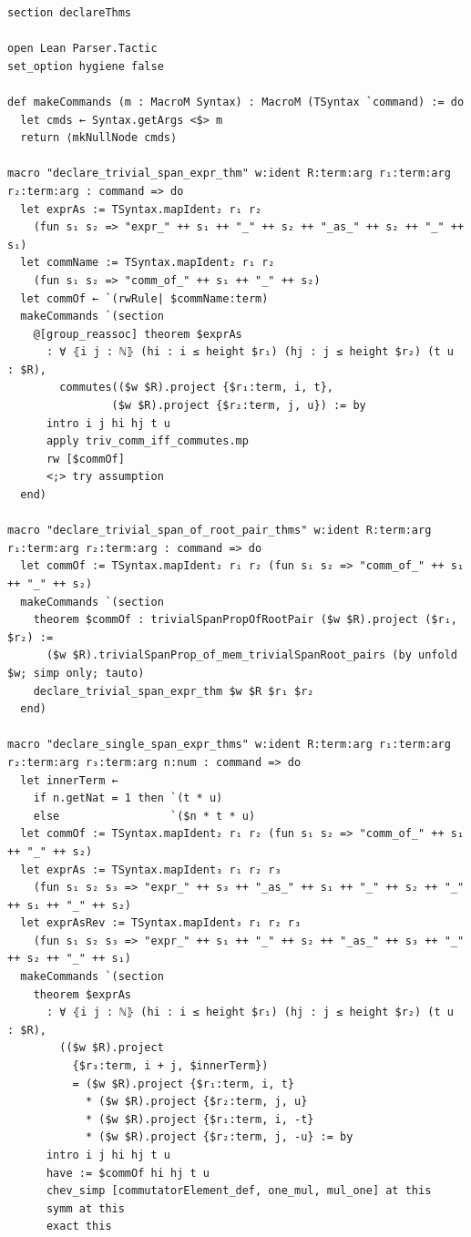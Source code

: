 \begin{Verbatim}
section declareThms

open Lean Parser.Tactic
set_option hygiene false

def makeCommands (m : MacroM Syntax) : MacroM (TSyntax `command) := do
  let cmds ← Syntax.getArgs <$> m
  return ⟨mkNullNode cmds⟩

macro "declare_trivial_span_expr_thm" w:ident R:term:arg r₁:term:arg r₂:term:arg : command => do
  let exprAs := TSyntax.mapIdent₂ r₁ r₂
    (fun s₁ s₂ => "expr_" ++ s₁ ++ "_" ++ s₂ ++ "_as_" ++ s₂ ++ "_" ++ s₁)
  let commName := TSyntax.mapIdent₂ r₁ r₂
    (fun s₁ s₂ => "comm_of_" ++ s₁ ++ "_" ++ s₂)
  let commOf ← `(rwRule| $commName:term)
  makeCommands `(section
    @[group_reassoc] theorem $exprAs
      : ∀ ⦃i j : ℕ⦄ (hi : i ≤ height $r₁) (hj : j ≤ height $r₂) (t u : $R),
        commutes(($w $R).project {$r₁:term, i, t},
                ($w $R).project {$r₂:term, j, u}) := by
      intro i j hi hj t u
      apply triv_comm_iff_commutes.mp
      rw [$commOf]
      <;> try assumption
  end)

macro "declare_trivial_span_of_root_pair_thms" w:ident R:term:arg r₁:term:arg r₂:term:arg : command => do
  let commOf := TSyntax.mapIdent₂ r₁ r₂ (fun s₁ s₂ => "comm_of_" ++ s₁ ++ "_" ++ s₂)
  makeCommands `(section
    theorem $commOf : trivialSpanPropOfRootPair ($w $R).project ($r₁, $r₂) :=
      ($w $R).trivialSpanProp_of_mem_trivialSpanRoot_pairs (by unfold $w; simp only; tauto)
    declare_trivial_span_expr_thm $w $R $r₁ $r₂
  end)

macro "declare_single_span_expr_thms" w:ident R:term:arg r₁:term:arg r₂:term:arg r₃:term:arg n:num : command => do
  let innerTerm ←
    if n.getNat = 1 then `(t * u)
    else                 `($n * t * u)
  let commOf := TSyntax.mapIdent₂ r₁ r₂ (fun s₁ s₂ => "comm_of_" ++ s₁ ++ "_" ++ s₂)
  let exprAs := TSyntax.mapIdent₃ r₁ r₂ r₃
    (fun s₁ s₂ s₃ => "expr_" ++ s₃ ++ "_as_" ++ s₁ ++ "_" ++ s₂ ++ "_" ++ s₁ ++ "_" ++ s₂)
  let exprAsRev := TSyntax.mapIdent₃ r₁ r₂ r₃
    (fun s₁ s₂ s₃ => "expr_" ++ s₁ ++ "_" ++ s₂ ++ "_as_" ++ s₃ ++ "_" ++ s₂ ++ "_" ++ s₁)
  makeCommands `(section
    theorem $exprAs
      : ∀ ⦃i j : ℕ⦄ (hi : i ≤ height $r₁) (hj : j ≤ height $r₂) (t u : $R),
        (($w $R).project
          {$r₃:term, i + j, $innerTerm})
          = ($w $R).project {$r₁:term, i, t}
            * ($w $R).project {$r₂:term, j, u}
            * ($w $R).project {$r₁:term, i, -t}
            * ($w $R).project {$r₂:term, j, -u} := by
      intro i j hi hj t u
      have := $commOf hi hj t u
      chev_simp [commutatorElement_def, one_mul, mul_one] at this
      symm at this
      exact this


\end{Verbatim}
